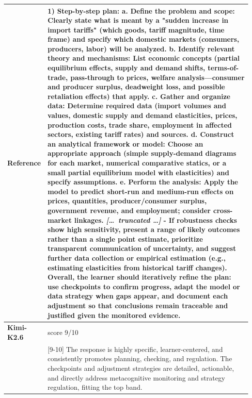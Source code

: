 \begin{longtable}{@{}l p{12.5cm}@{}}
  \textbf{Reference} & 1) Step-by-step plan: \newline a. Define the problem and scope: Clearly state what is meant by a "sudden increase in import tariffs" (which goods, tariff magnitude, time frame) and specify which domestic markets (consumers, producers, labor) will be analyzed. \newline b. Identify relevant theory and mechanisms: List economic concepts (partial equilibrium effects, supply and demand shifts, terms-of-trade, pass-through to prices, welfare analysis---consumer and producer surplus, deadweight loss, and possible retaliation effects) that apply. \newline c. Gather and organize data: Determine required data (import volumes and values, domestic supply and demand elasticities, prices, production costs, trade share, employment in affected sectors, existing tariff rates) and sources. \newline d. Construct an analytical framework or model: Choose an appropriate approach (simple supply-demand diagrams for each market, numerical comparative statics, or a small partial equilibrium model with elasticities) and specify assumptions. \newline e. Perform the analysis: Apply the model to predict short-run and medium-run effects on prices, quantities, producer/consumer surplus, government revenue, and employment; consider cross-market linkages. \newline \textit{[\ldots\ truncated \ldots]} \newline - If robustness checks show high sensitivity, present a range of likely outcomes rather than a single point estimate, prioritize transparent communication of uncertainty, and suggest further data collection or empirical estimation (e.g., estimating elasticities from historical tariff changes). \newline Overall, the learner should iteratively refine the plan: use checkpoints to confirm progress, adapt the model or data strategy when gaps appear, and document each adjustment so that conclusions remain traceable and justified given the monitored evidence. \\
  \midrule
  \textbf{Kimi-K2.6} & score 9/10 \\
  & [9-10] The response is highly specific, learner-centered, and consistently promotes planning, checking, and regulation. The checkpoints and adjustment strategies are detailed, actionable, and directly address metacognitive monitoring and strategy regulation, fitting the top band. \\

\end{longtable}
